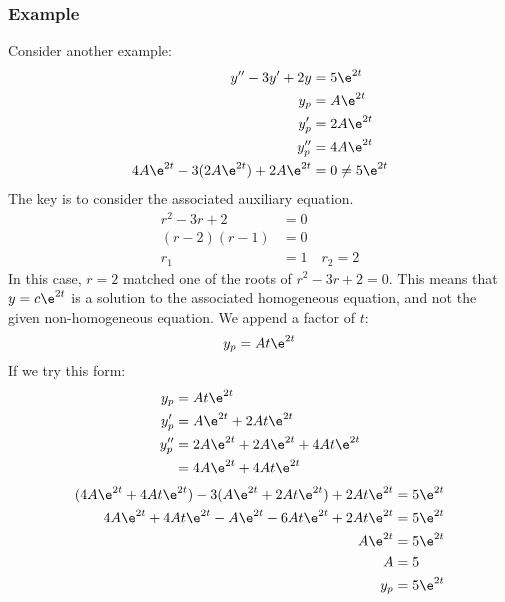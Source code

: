 \documentclass{math}
\begin{document}
\subsubsection*{Example}
Consider another example:
\begin{align*}
  y''-3y'+2y &= 5\e^{2t} \\
  y_p &= A\e^{2t} \\
  y_p' &= 2A\e^{2t} \\
  y_p'' &= 4A\e^{2t} \\
  4A\e^{2t}-3(2A\e^{2t})+2A\e^{2t} &= 0 \ne 5\e^{2t}
\end{align*}
The key is to consider the associated auxiliary equation.
\begin{align*}
  r^2-3r+2 &= 0 \\
  (r-2)(r-1) &= 0 \\
  r_1 &= 1 \quad r_2 = 2
\end{align*}
In this case, \( r = 2 \) matched one of the roots of \( r^2-3r+2 = 0 \). This
means that \( y = c\e^{2t} \) is a solution to the associated homogeneous
equation, and not the given non-homogeneous equation. We append a factor of
\( t \):
\[ y_p = At\e^{2t} \]
If we try this form:
\begin{align*}
  y_p &= At\e^{2t} \\
  y_p' &= A\e^{2t}+2At\e^{2t} \\
  y_p'' &= 2A\e^{2t}+2A\e^{2t}+4At\e^{2t} \\
  &= 4A\e^{2t}+4At\e^{2t}
\end{align*}
\begin{align*}
  (4A\e^{2t}+4At\e^{2t})-3(A\e^{2t}+2At\e^{2t})+2At\e^{2t} &= 5\e^{2t} \\
  4A\e^{2t}+4At\e^{2t}-A\e^{2t}-6At\e^{2t}+2At\e^{2t} &= 5\e^{2t} \\
  A\e^{2t} &= 5\e^{2t} \\
  A &= 5 \\
  y_p &= 5\e^{2t}
\end{align*}
\end{document}
